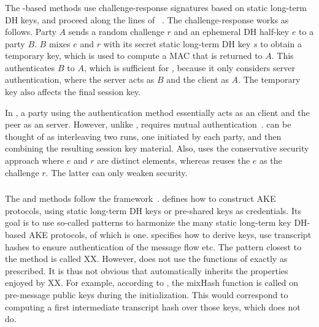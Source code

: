 \subsubsection{\mOptls{}}
\label{sec:optls}
The \mStat-based methods use challenge-response signatures based on static
long-term DH keys, and proceed along the lines of
\mOptls~\cite{DBLP:conf/eurosp/KrawczykW16}.
%
The challenge-response works as follows.
Party $A$ sends a random challenge $r$
and an ephemeral DH half-key $e$ to a party $B$.
%
$B$ mixes $e$ and $r$ with its secret static
long-term DH key $s$ to obtain a temporary key, which
%
is used to compute a MAC that is returned to $A$.
%
This authenticates $B$ to $A$, which is sufficient for \mOptls, 
because it only considers server authentication, where the server acts as $B$
and the client as $A$.
%
The temporary key also affects the final session key.
%

In \mEdhoc, a party using the \mStat{} authentication method
essentially acts as an \mOptls{} client and the peer as an \mOptls{}
server.
%
However, unlike \mOptls{}, \mEdhoc{} requires mutual
authentication~\cite{ietf-lake-reqs-04}.
%
\mStatStat{} can be thought of as interleaving two \mOptls{}
runs, one initiated by each party, and then combining the resulting session key
material.
%
Also, \mOptls{} uses the conservative security approach where $e$ and $r$
are distinct elements, whereas \mEdhoc{} reuses the $e$ as the challenge $r$.
%
The latter can only weaken security.
%

\subsubsection{\mNoise{}}
The \mStatStat{} and \mPskPsk{} methods follow the \mNoise{}
framework~\cite{perrin2016noise}.
%
\mNoise{} defines how to construct AKE protocols, using static long-term DH
keys or pre-shared keys as credentials.
%
Its goal is to use so-called patterns to harmonize the many static long-term
key DH-based AKE protocols, of which \mOptls{} is one.
%
\mNoise{} specifies how to derive keys, use transcript hashes to ensure
authentication of the message flow etc.
%
The \mNoise{} pattern closest to the \mStatStat{} method is called XX.
%
However, \mEdhoc{} does not use the functions of \mNoise{} exactly as
prescribed.
%
It is thus not obvious that \mEdhoc{} automatically inherits
the properties enjoyed by XX.
%
For example, according to \mNoise{}, the mixHash function is called on
pre-message public keys during the initialization.
%
This would correspond to \mEdhoc{} computing a first intermediate transcript
hash over those keys, which \mEdhoc{} does not do.
%

